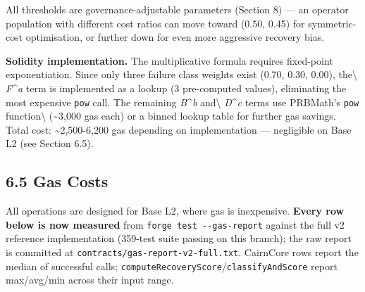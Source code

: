 \documentclass[
  10pt,
]{article}
\begin{document}
All thresholds are governance-adjustable parameters (Section 8) --- an
operator population with different cost ratios can move toward (0.50,
0.45) for symmetric-cost optimisation, or further down for even more
aggressive recovery bias.

\textbf{Solidity implementation.} The multiplicative formula requires
fixed-point exponentiation. Since only three failure class weights exist
(0.70, 0.30, 0.00), the\textbackslash{} \emph{F}\^{}\emph{a} term is
implemented as a lookup (3 pre-computed values), eliminating the most
expensive \texttt{pow} call. The remaining \emph{B}\^{}\emph{b}
and\textbackslash{} \emph{D}\^{}\emph{c} terms use PRBMath's
\texttt{pow} function\textbackslash{} (\textasciitilde3,000 gas each) or
a binned lookup table for further gas savings. Total cost:
\textasciitilde2,500-6,200 gas depending on implementation ---
negligible on Base L2 (see Section 6.5).

\hypertarget{gas-costs}{%
\subsection{6.5 Gas Costs}\label{gas-costs}}

All operations are designed for Base L2, where gas is inexpensive.
\textbf{Every row below is now measured} from
\texttt{forge\ test\ -\/-gas-report} against the full v2 reference
implementation (359-test suite passing on this branch); the raw report is
committed at \texttt{contracts/gas-report-v2-full.txt}. CairnCore rows
report the median of successful calls;
\texttt{computeRecoveryScore}/\texttt{classifyAndScore} report max/avg/min
across their input range.
\end{document}

